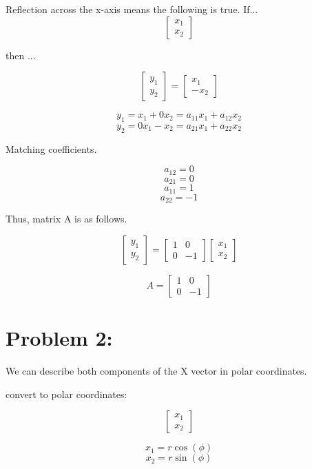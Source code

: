 \documentclass{ximera}
\begin{document}
\begin{enumerate}
\noindent Reflection across the x-axis means the following is true. If...
\[
\begin{bmatrix}
x_1 \\
x_2
\end{bmatrix}
\]

\noindent then ...

\[    
\begin{bmatrix}
y_1 \\
y_2
\end{bmatrix}
= 
\begin{bmatrix}
x_1 \\
-x_2
\end{bmatrix}
\]

\[y_1 = x_1 + 0x_2 = a_{11}x_1+a_{12}x_2\]
\[y_2 = 0x_1-x_2  = a_{21}x_1+a_{22}x_2\]

\noindent Matching coefficients.

\[a_{12} = 0\]
\[a_{21} = 0\]
\[a_{11} = 1\]
\[a_{22} = -1\]

\noindent Thus, matrix A is as follows.

\[
\begin{bmatrix}
y_1 \\
y_2
\end{bmatrix} = 
\begin{bmatrix}
    1 & 0 \\
    0 & -1
\end{bmatrix}  
\begin{bmatrix}
    x_1 \\
    x_2
\end{bmatrix}
\]

\[\boxed{
A=\begin{bmatrix}
    1 & 0 \\
    0 & -1
    \end{bmatrix}}
\]

\section*{Problem 2:}

\noindent We can describe both components of the X vector in polar coordinates.

\noindent convert to polar coordinates:

\[
\begin{bmatrix}
    x_1 \\
    x_2
\end{bmatrix}
\]

\[
x_1 = r \cos(\phi) 
\]
\[
x_2 = r \sin(\phi)
\]


\end{enumerate}
\end{document}
